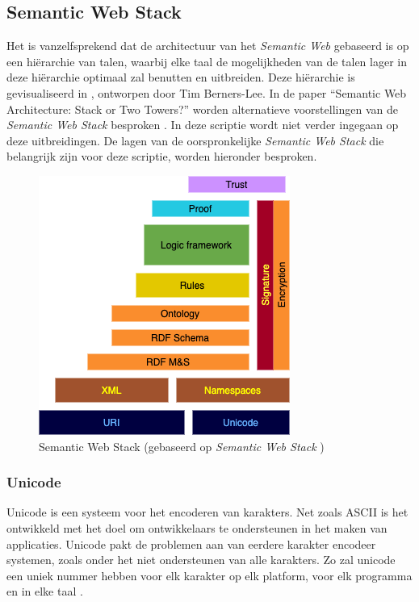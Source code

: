 \subsection{Semantic Web Stack}
Het is vanzelfsprekend dat de architectuur van het \textit{Semantic Web} gebaseerd is op een hiërarchie van talen, waarbij elke taal de mogelijkheden van de talen lager in deze hiërarchie optimaal zal benutten en uitbreiden. Deze hiërarchie is gevisualiseerd in , ontworpen door Tim Berners-Lee. In de paper ``Semantic Web Architecture: Stack or Two Towers?'' worden alternatieve voorstellingen van de \textit{Semantic Web Stack} besproken \cite{horrocks2005semantic}. In deze scriptie wordt niet verder ingegaan op deze uitbreidingen. De lagen van de oorspronkelijke \textit{Semantic Web Stack} die belangrijk zijn voor deze scriptie, worden hieronder besproken.

\begin{figure}[ht]
    \centering
    \includegraphics[width=0.5\linewidth]{images/Semantic Web Stack.png}
    \caption{Semantic Web Stack (gebaseerd op \textit{Semantic Web Stack} \cite{semanticwebstack})}
    \label{fig:semantic_web_stack}
\end{figure}

\subsubsection{Unicode}
Unicode is een systeem voor het encoderen van karakters. Net zoals ASCII is het ontwikkeld met het doel om ontwikkelaars te ondersteunen in het maken van applicaties. Unicode pakt de problemen aan van eerdere karakter encodeer systemen, zoals onder het niet ondersteunen van alle karakters. Zo zal unicode een uniek nummer hebben voor elk karakter op elk platform, voor elk programma en in elke taal \cite{unicode}.

